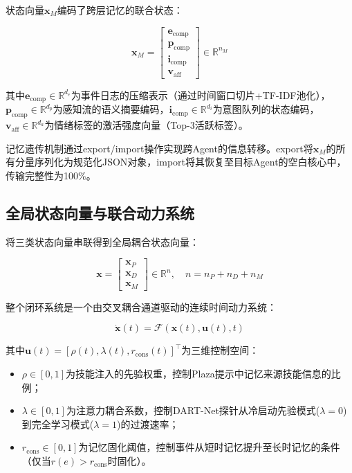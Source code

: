 \documentclass[twocolumn,10.5pt]{ctexart}
\def\bmat#1{\begin{bmatrix}#1\end{bmatrix}}
\def\R{\mathbb{R}}
\begin{document}
状态向量$\mathbf{x}_M$编码了跨层记忆的联合状态：

\begin{equation}
\mathbf{x}_M = \bmat{
\mathbf{e}_{\text{comp}} \\
\mathbf{p}_{\text{comp}} \\
\mathbf{i}_{\text{comp}} \\
\mathbf{v}_{\text{aff}}
} \in \R^{n_M}
\label{eq:xm}
\end{equation}

其中$\mathbf{e}_{\text{comp}} \in \R^{d_e}$为事件日志的压缩表示（通过时间窗口切片+TF-IDF池化），$\mathbf{p}_{\text{comp}} \in \R^{d_p}$为感知流的语义摘要编码，$\mathbf{i}_{\text{comp}} \in \R^{d_i}$为意图队列的状态编码，$\mathbf{v}_{\text{aff}} \in \R^{d_a}$为情绪标签的激活强度向量（Top-3活跃标签）。

记忆遗传机制通过export/import操作实现跨Agent的信息转移。export将$\mathbf{x}_M$的所有分量序列化为规范化JSON对象，import将其恢复至目标Agent的空白核心中，传输完整性为100\%。

\subsection{全局状态向量与联合动力系统}

将三类状态向量串联得到全局耦合状态向量：

\begin{equation}
\mathbf{x} = \bmat{\mathbf{x}_P \\ \mathbf{x}_D \\ \mathbf{x}_M} \in \R^{n}, \quad n = n_P + n_D + n_M
\label{eq:global_x}
\end{equation}

整个闭环系统是一个由交叉耦合通道驱动的连续时间动力系统：

\begin{equation}
\dot{\mathbf{x}}(t) = \mathcal{F}(\mathbf{x}(t), \mathbf{u}(t), t)
\label{eq:global_dynamics}
\end{equation}

其中$\mathbf{u}(t) = [\rho(t), \lambda(t), r_{\text{cons}}(t)]^\top$为三维控制空间：
\begin{itemize}[nosep]
\item $\rho \in [0,1]$为技能注入的先验权重，控制Plaza提示中记忆来源技能信息的比例；
\item $\lambda \in [0,1]$为注意力耦合系数，控制DART-Net探针从冷启动先验模式($\lambda=0$)到完全学习模式($\lambda=1$)的过渡速率；
\item $r_{\text{cons}} \in [0,1]$为记忆固化阈值，控制事件从短时记忆提升至长时记忆的条件（仅当$r(e) > r_{\text{cons}}$时固化）。
\end{itemize}
\end{document}
